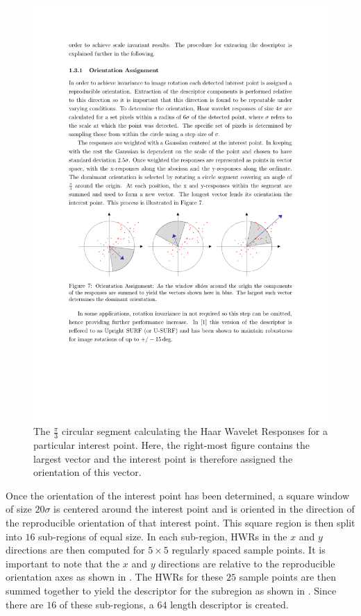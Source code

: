\documentclass[11pt]{report}
\begin{document}
\begin{figure}[h!] 
  \centering
    \includegraphics[width=1.0\textwidth]{../Drawings/methods/SURF2D_orientation_assignment.pdf}
    \caption{The $\frac{\pi}{3}$ circular segment calculating the Haar Wavelet Responses for a particular interest point. Here, the right-most figure contains the largest vector and the interest point is therefore assigned the orientation of this vector.}
    \label{fig:circularSegment}
\end{figure}

Once the orientation of the interest point has been determined, a square window of size $20\sigma$ is centered around the interest point and is oriented in the direction of the reproducible orientation of that interest point. This square region is then split into $16$ sub-regions of equal size. In each sub-region, HWRs in the $x$ and $y$ directions are then computed for $5 \times 5$ regularly spaced sample points. It is important to note that the $x$ and $y$ directions are relative to the reproducible orientation axes as shown in  \cite{Evans2009}. The HWRs for these $25$ sample points are then summed together to yield the descriptor for the subregion as shown in . Since there are $16$ of these sub-regions, a $64$ length descriptor is created.\\
\end{document}
